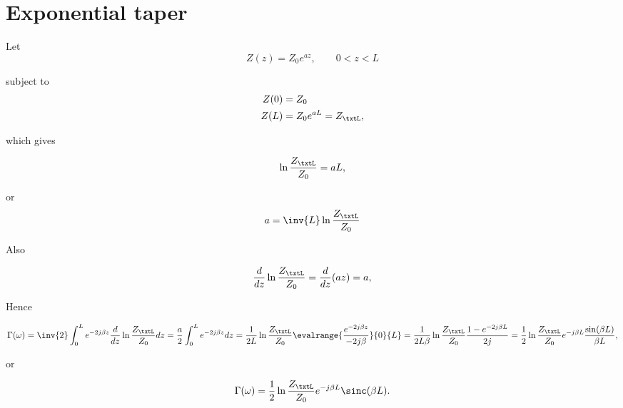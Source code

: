 \section{Exponential taper}

Let
\begin{equation}\label{eqn:continuumAndOtherTransformersCore:620}
Z(z) = Z_0 e^{a z}, \qquad 0 < z < L
\end{equation}

subject to
\begin{equation}\label{eqn:continuumAndOtherTransformersCore:640}
\begin{aligned}
Z(0) &= Z_0 \\
Z(L) &= Z_0 e^{a L} = Z_\txtL,
\end{aligned}
\end{equation}

which gives

\begin{equation}\label{eqn:continuumAndOtherTransformersCore:660}
\ln \frac{Z_\txtL}{Z_0} = a L,
\end{equation}

or
\begin{equation}\label{eqn:continuumAndOtherTransformersCore:680}
a = \inv{L} \ln \frac{Z_\txtL}{Z_0}
\end{equation}

Also

\begin{equation}\label{eqn:continuumAndOtherTransformersCore:700}
\frac{d}{dz} \ln \frac{Z_\txtL}{Z_0}
= \frac{d}{dz} (az)
= a,
\end{equation}

Hence

\begin{dmath}\label{eqn:continuumAndOtherTransformersCore:740}
\Gamma(\omega)
= \inv{2} \int_0^L e^{-2 j \beta z} \frac{d}{dz} \ln \frac{Z_\txtL}{Z_0} dz
= \frac{a}{2}
\int_0^L e^{-2 j \beta z} dz
= \frac{1}{2L} \ln \frac{Z_\txtL}{Z_0}
\evalrange{ \frac{e^{-2 j \beta z} }{ -2 j \beta} }{0}{L}
= \frac{1}{2L \beta} \ln \frac{Z_\txtL}{Z_0}
\frac{ 1 - e^{-2 j \beta L} }{2 j}
= \frac{1}{2} \ln \frac{Z_\txtL}{Z_0} e^{-j \beta L} \frac{\sin( \beta L )}{\beta L},
\end{dmath}

or

\begin{dmath}\label{eqn:continuumAndOtherTransformersCore:940}
\Gamma(\omega) = \frac{1}{2} \ln \frac{Z_\txtL}{Z_0} e^{-j \beta L} \sinc( \beta L ).
\end{dmath}

